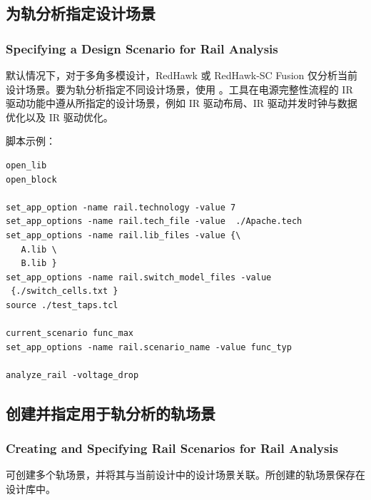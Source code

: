 \subsection{为轨分析指定设计场景}
\subsubsection*{Specifying a Design Scenario for Rail Analysis}

默认情况下，对于多角多模设计，RedHawk 或 RedHawk-SC Fusion 仅分析当前设计场景。要为轨分析指定不同设计场景，使用 。工具在电源完整性流程的 IR 驱动功能中遵从所指定的设计场景，例如 IR 驱动布局、IR 驱动并发时钟与数据优化以及 IR 驱动优化。

脚本示例：
\begin{lstlisting}
open_lib
open_block

set_app_option -name rail.technology -value 7
set_app_options -name rail.tech_file -value  ./Apache.tech
set_app_options -name rail.lib_files -value {\
   A.lib \
   B.lib }
set_app_options -name rail.switch_model_files -value
 {./switch_cells.txt }
source ./test_taps.tcl

current_scenario func_max
set_app_options -name rail.scenario_name -value func_typ

analyze_rail -voltage_drop
\end{lstlisting}

\subsection{创建并指定用于轨分析的轨场景}
\subsubsection*{Creating and Specifying Rail Scenarios for Rail Analysis}

可创建多个轨场景，并将其与当前设计中的设计场景关联。所创建的轨场景保存在设计库中。

